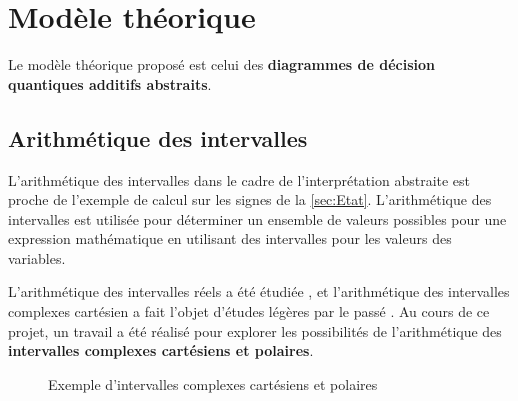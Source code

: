 \newpage

\chapter{Modèle théorique}
\label{ch:Modele}

Le modèle théorique proposé est celui des \textbf{diagrammes de décision quantiques additifs abstraits}.

\section{Arithmétique des intervalles}
\label{sec:ArithmetiqueIntervalles}

L'arithmétique des intervalles dans le cadre de l'interprétation abstraite est proche de l'exemple de calcul sur les signes de la \autoref{sec:Etat}. L'arithmétique des intervalles est utilisée pour déterminer un ensemble de valeurs possibles pour une expression mathématique en utilisant des intervalles pour les valeurs des variables.

L'arithmétique des intervalles réels a été étudiée \cite{Sunaga_2009}, et l'arithmétique des intervalles complexes cartésien a fait l'objet d'études légères par le passé \cite{Rokne_1971}. Au cours de ce projet, un travail a été réalisé pour explorer les possibilités de l'arithmétique des \textbf{intervalles complexes cartésiens et polaires}.

\begin{figure}
  \centering
  \caption{Exemple d'intervalles complexes cartésiens et polaires}
  \label{fig:intervalles}
\end{figure}

